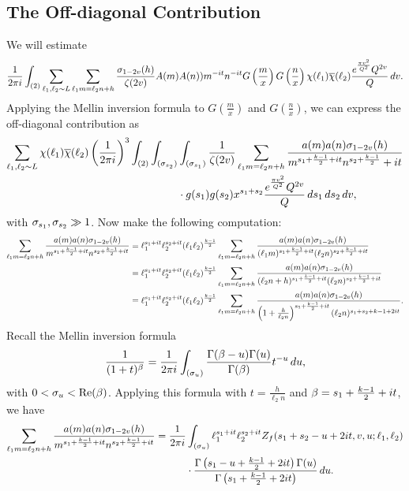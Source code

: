 \documentclass[12pt,reqno,oneside]{amsart}
\begin{document}
  \subsection*{The Off-diagonal Contribution}
    We will estimate
    \[
      \frac{1}{2\pi i}\int_{(2)}\sum_{\ell_{1},\ell_{2} \sim L}\sum_{\ell_{1}m = \ell_{2}n+h}\frac{\sigma_{1-2v}(h)}{\zeta(2v)}A(m)A(n))m^{-it}n^{-it}G\left(\frac{m}{x}\right)G\left(\frac{n}{x}\right)\chi(\ell_{1})\overline{\chi}(\ell_{2})\frac{e^{\frac{\pi v^{2}}{Q^{2}}}Q^{2v}}{Q}\,dv.
    \]
    Applying the Mellin inversion formula to $G\left(\frac{m}{x}\right)$ and $G\left(\frac{n}{x}\right)$, we can express the off-diagonal contribution as
    \begin{align*}
      \sum_{\ell_{1},\ell_{2} \sim L}\chi(\ell_{1})\overline{\chi}(\ell_{2})\left(\frac{1}{2\pi i}\right)^{3}\int_{(2)}\int_{(\sigma_{s_{2}})}&\int_{(\sigma_{s_{1}})}\frac{1}{\zeta(2v)}\sum_{\ell_{1}m = \ell_{2}n+h}\frac{a(m)a(n)\sigma_{1-2v}(h)}{m^{s_{1}+\frac{k-1}{2}+it}n^{s_{2}+\frac{k-1}{2}}+it} \\
      &\cdot g(s_{1})g(s_{2})x^{s_{1}+s_{2}}\frac{e^{\frac{\pi v^{2}}{Q^{2}}}Q^{2v}}{Q}\,ds_{1}\,ds_{2}\,dv,
    \end{align*}
    with $\sigma_{s_{1}},\sigma_{s_{2}} \gg 1$. Now make the following computation:
    \begin{align*}
      \sum_{\ell_{1}m = \ell_{2}n+h}\frac{a(m)a(n)\sigma_{1-2v}(h)}{m^{s_{1}+\frac{k-1}{2}+it}n^{s_{2}+\frac{k-1}{2}+it}} &= \ell_{1}^{s_{1}+it}\ell_{2}^{s_{2}+it}(\ell_{1}\ell_{2})^{\frac{k-1}{2}}\sum_{\ell_{1}m = \ell_{2}n+h}\frac{a(m)a(n)\sigma_{1-2v}(h)}{(\ell_{1}m)^{s_{1}+\frac{k-1}{2}+it}(\ell_{2}n)^{s_{2}+\frac{k-1}{2}+it}} \\
      &= \ell_{1}^{s_{1}+it}\ell_{2}^{s_{2}+it}(\ell_{1}\ell_{2})^{\frac{k-1}{2}}\sum_{\ell_{1}m = \ell_{2}n+h}\frac{a(m)a(n)\sigma_{1-2v}(h)}{(\ell_{2}n+h)^{s_{1}+\frac{k-1}{2}+it}(\ell_{2}n)^{s_{2}+\frac{k-1}{2}+it}} \\
      &= \ell_{1}^{s_{1}+it}\ell_{2}^{s_{2}+it}(\ell_{1}\ell_{2})^{\frac{k-1}{2}}\sum_{\ell_{1}m = \ell_{2}n+h}\frac{a(m)a(n)\sigma_{1-2v}(h)}{\left(1+\frac{h}{\ell_{2}n}\right)^{s_{1}+\frac{k-1}{2}+it}(\ell_{2}n)^{s_{1}+s_{2}+k-1+2it}}.
    \end{align*}
    Recall the Mellin inversion formula
    \[
      \frac{1}{(1+t)^{\beta}} = \frac{1}{2\pi i}\int_{(\sigma_{u})}\frac{\Gamma(\beta-u)\Gamma(u)}{\Gamma(\beta)}t^{-u}\,du,
    \]
    with $0 < \sigma_{u} < \mathrm{Re}(\beta)$. Applying this formula with $t = \frac{h}{\ell_{2}n}$ and $\beta = s_{1}+\frac{k-1}{2}+it$, we have
    \begin{align*}
      \sum_{\ell_{1}m = \ell_{2}n+h}\frac{a(m)a(n)\sigma_{1-2v}(h)}{m^{s_{1}+\frac{k-1}{2}+it}n^{s_{2}+\frac{k-1}{2}+it}} = \frac{1}{2\pi i}&\int_{(\sigma_{u})}\ell_{1}^{s_{1}+it}\ell_{2}^{s_{2}+it}Z_{f}(s_{1}+s_{2}-u+2it,v,u;\ell_{1},\ell_{2}) \\
      &\cdot \frac{\Gamma\left(s_{1}-u+\frac{k-1}{2}+2it\right)\Gamma(u)}{\Gamma\left(s_{1}+\frac{k-1}{2}+2it\right)}\,du.
    \end{align*}
\end{document}
